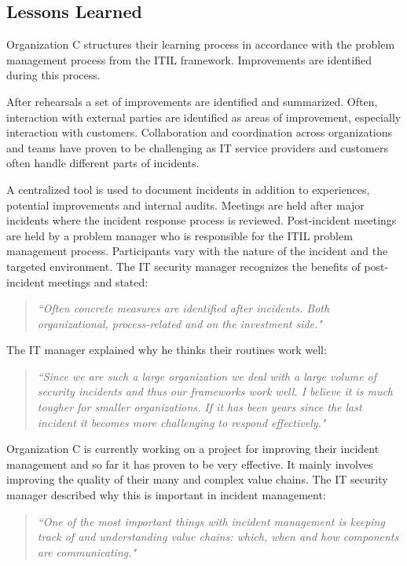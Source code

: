 \subsection{Lessons Learned}
Organization C structures their learning process in accordance with the problem management process from the ITIL framework. Improvements are identified during this process. 

After rehearsals a set of improvements are identified and summarized. Often, interaction with external parties are identified as areas of improvement, especially interaction with customers. Collaboration and coordination across organizations and teams have proven to be challenging as IT service providers and customers often handle different parts of incidents. 

A centralized tool is used to document incidents in addition to experiences, potential improvements and internal audits. Meetings are held after major incidents where the incident response process is reviewed. Post-incident meetings are held by a problem manager who is responsible for the ITIL problem management process. Participants vary with the nature of the incident and the targeted environment. The IT security manager recognizes the benefits of post-incident meetings and stated:

\begin{quote}
\textit{``Often concrete measures are identified after incidents. Both organizational, process-related and on the investment side."}
\end{quote}

The IT manager explained why he thinks their routines work well:

\begin{quote}
\textit{``Since we are such a large organization we deal with a large volume of security incidents and thus our frameworks work well. I believe it is much tougher for smaller organizations. If it has been years since the last incident it becomes more challenging to respond effectively."}
\end{quote}

Organization C is currently working on a project for improving their incident management and so far it has proven to be very effective. It mainly involves improving the quality of their many and complex value chains. The IT security manager described why this is important in incident management:

\begin{quote}
\textit{``One of the most important things with incident management is keeping track of and understanding value chains: which, when and how components are communicating."}
\end{quote}

